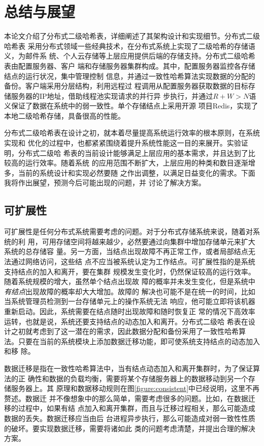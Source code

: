 \chapter{总结与展望}\label{chapter:conclusion}
本论文介绍了分布式二级哈希表，详细阐述了其架构设计和实现细节。分布式二级哈希表
采用分布式领域一些经典技术，在分布式系统上实现了二级哈希的存储语义，为邮件系
统、个人云存储等上层应用提供后端的存储支持。分布式二级哈希表由配置服务器、客户
端和存储服务器集群构成。其中，配置服务器监控各存储结点的运行状况，集中管理控制
信息，并通过一致性哈希算法实现数据的分配的备份。客户端采用分层结构，利用远程过
程调用从配置服务器获取数据的目标存储服务器的IP地址，借助线程池实现请求的并行异
步执行，并通过$R+W>N$语义保证了数据在系统中的弱一致性。单个存储结点上采用开源
项目Redis，实现了本地二级哈希存储，具备很高的性能。

分布式二级哈希表在设计之初，就本着尽量提高系统运行效率的根本原则，在系统实现和
优化的过程中，也都紧紧围绕着提升系统性能这一目的来展开。实验证明，分布式二级哈
希表的当前设计能够满足上层应用的基本需求，并且达到了比较高的运行效率。随着系统
的应用范围不断扩大，上层应用的种类和数目逐渐增多，当前的系统设计和实现必然要随
之作出调整，以满足日益变化的需求。下面我将作出展望，预测今后可能出现的问题，并
讨论了解决方案。

\section{可扩展性}
可扩展性是任何分布式系统需要考虑的问题。对于分布式存储系统来说，随着对系统的利
用，可用存储空间将越来越少，必然要通过向集群中增加存储单元来扩大系统的总存储容
量。另一方面，当结点出现故障不再正常工作，或者局部结点无法通过网络访问，这些结
点不应当被系统认定为工作结点。可扩展性指的是系统支持结点的加入和离开，要在集群
规模发生变化时，仍然保证较高的运行效率。随着系统规模的增大，虽然单个结点出现故
障的概率并未发生变化，但是系统中\emph{有结点}出现故障的概率却大大增加。故障的
解决也可能不是在统一的时间，比如当系统管理员检测到一台存储单元上的操作系统无法
响应，他可能立即将该机器重新启动。因此，系统需要在结点随时出现故障和随时恢复正
常的情况下高效率运转，也就是说，系统还要支持结点的动态加入和离开。分布式二级哈
希表在设计之初就考虑到了这一潜在的需求，因此数据分配和备份采用了一致性哈希算
法。只要在当前的系统模块上添加数据迁移功能，即可使系统支持结点的动态加入和移
除。

数据迁移是指在一致性哈希算法中，当有结点动态加入和离开集群时，为了保证算法的正
确性和数据的负载均衡，需要将某个存储服务器上的数据移动到另一个存储服务器上。其
原理和数据移动规则在图\ref{figure:consistent}中已经说明，这里不再赘述。数据迁
并不像想象中的那么简单，需要考虑很多的问题。比如，在数据迁移的过程中，如果有结
点加入和离开集群，而且与迁移过程相关，那么可能造成数据的丢失。数据迁移应当由后
台进程异步执行，那么可能造成对弱一致性性质的破坏。要实现数据迁移，需要将诸如此
类的问题考虑清楚，并提出合理的解决方案。

